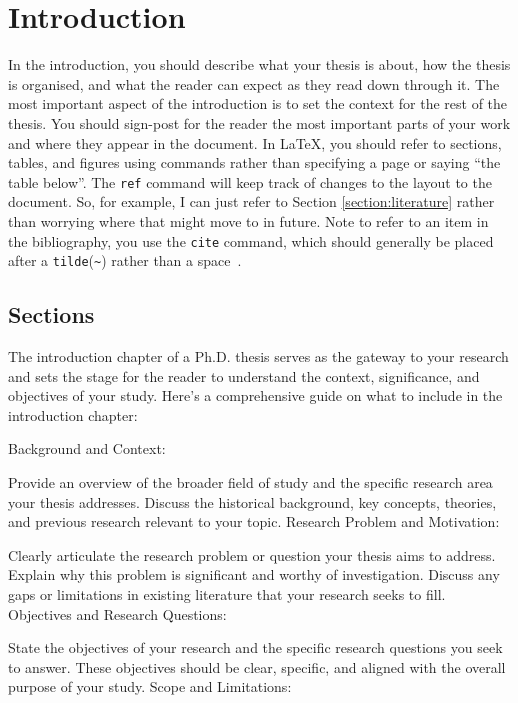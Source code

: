 
\chapter{Introduction}
\label{section:introduction}

In the introduction, you should describe what your thesis is about, how the
thesis is organised, and what the reader can expect as they read down through
it.
The most important aspect of the introduction is to set the context for the
rest of the thesis.
You should sign-post for the reader the most important parts of your work and
where they appear in the document.
In \LaTeX, you should refer to sections, tables, and figures using commands
rather than specifying a page or saying ``the table below''. The \texttt{ref}
command will keep track of changes to the layout to the document. So, for
example, I can just refer to Section \ref{section:literature} rather than
worrying where that might move to in future.
Note to refer to an item in the bibliography, you use the \texttt{cite} command,
which should generally be placed after a \texttt{tilde}(\texttt{\~}) rather than
a space~\cite{einstein}.


\section{Sections}

The introduction chapter of a Ph.D. thesis serves as the gateway to your research and sets the stage for the reader to understand the context, significance, and objectives of your study. Here's a comprehensive guide on what to include in the introduction chapter:

Background and Context:

Provide an overview of the broader field of study and the specific research area your thesis addresses. Discuss the historical background, key concepts, theories, and previous research relevant to your topic.
Research Problem and Motivation:

Clearly articulate the research problem or question your thesis aims to address. Explain why this problem is significant and worthy of investigation. Discuss any gaps or limitations in existing literature that your research seeks to fill.
Objectives and Research Questions:

State the objectives of your research and the specific research questions you seek to answer. These objectives should be clear, specific, and aligned with the overall purpose of your study.
Scope and Limitations:

